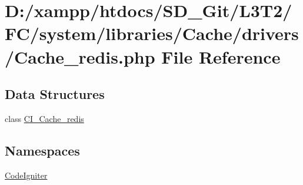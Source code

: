 \hypertarget{system_2libraries_2_cache_2drivers_2_cache__redis_8php}{}\section{D\+:/xampp/htdocs/\+S\+D\+\_\+\+Git/\+L3\+T2/\+F\+C/system/libraries/\+Cache/drivers/\+Cache\+\_\+redis.php File Reference}
\label{system_2libraries_2_cache_2drivers_2_cache__redis_8php}
\subsection*{Data Structures}
\begin{DoxyCompactItemize}
\item 
class \hyperlink{class_c_i___cache__redis}{C\+I\+\_\+\+Cache\+\_\+redis}
\end{DoxyCompactItemize}
\subsection*{Namespaces}
\begin{DoxyCompactItemize}
\item 
 \hyperlink{namespace_code_igniter}{Code\+Igniter}
\end{DoxyCompactItemize}

